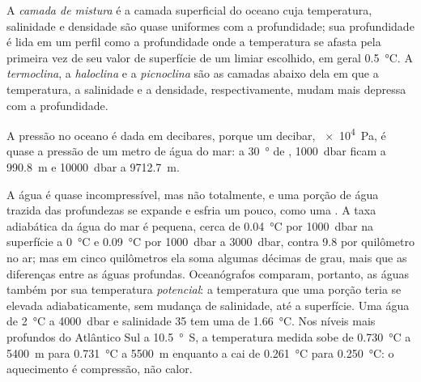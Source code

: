 \begin{definition}\label{def:b1:fluid-envelopes-structure:ocean-layers}
A \emph{camada de mistura} é a camada superficial do oceano cuja
temperatura, salinidade e densidade são quase uniformes com a profundidade; sua profundidade é
lida em um perfil como a profundidade onde a temperatura se afasta pela primeira vez de seu valor
de superfície de um limiar escolhido, em geral \qty{0.5}{\celsius}. A \emph{termoclina},
a \emph{haloclina} e a \emph{picnoclina} são as camadas abaixo
dela em que a temperatura, a salinidade e a densidade, respectivamente, mudam mais depressa com a
profundidade.
\end{definition}

A pressão no oceano é dada em decibares, porque um decibar, \qty{e4}{Pa}, é quase a pressão de um
metro de água do mar: a \qty{30}{\degree} de , \qty{1000}{dbar} ficam a \qty{990.8}{m} e
\qty{10000}{dbar} a \qty{9712.7}{m}.

A água é quase incompressível, mas não totalmente, e uma porção de água trazida das
profundezas se expande e esfria um pouco, como uma . A taxa adiabática da água do
mar é pequena, cerca de \qty{0.04}{\celsius} por \qty{1000}{dbar} na superfície a
\qty{0}{\celsius} e \qty{0.09}{\celsius} por \qty{1000}{dbar} a \qty{3000}{dbar}, contra \num{9.8}
por quilômetro no ar; mas em cinco quilômetros ela soma algumas décimas de grau, mais que as
diferenças entre as águas profundas. Oceanógrafos comparam, portanto, as águas também por sua
temperatura \emph{potencial}: a temperatura que uma porção teria se elevada adiabaticamente, sem
mudança de salinidade, até a superfície. Uma água de \qty{2}{\celsius} a \qty{4000}{dbar} e
salinidade 35 tem uma  de \qty{1.66}{\celsius}. Nos níveis mais profundos do
Atlântico Sul a \qty{10.5}{\degree S}, a temperatura medida sobe de \qty{0.730}{\celsius} a
\qty{5400}{m} para \qty{0.731}{\celsius} a \qty{5500}{m} enquanto a  cai de
\qty{0.261}{\celsius} para \qty{0.250}{\celsius}: o aquecimento é compressão, não calor.

